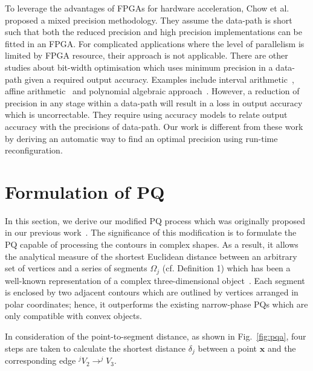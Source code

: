 To leverage the advantages of FPGAs for hardware acceleration, Chow et al.~\cite{chow11} proposed a mixed precision methodology.
They assume the data-path is short such that both the reduced precision and high precision implementations can be fitted in an FPGA.
For complicated applications where the level of parallelism is limited by FPGA resource, their approach is not applicable.
There are other studies about bit-width optimisation which uses minimum precision in a data-path given a required output accuracy.
Examples include interval arithmetic~\cite{fang03}, affine arithmetic~\cite{lee05,osborne07} and polynomial algebraic approach~\cite{boland10}.
However, a reduction of precision in any stage within a data-path will result in a loss in output accuracy which is uncorrectable.
They require using accuracy models to relate output accuracy with the precisions of data-path.
Our work is different from these work by deriving an automatic way to find an optimal precision using run-time reconfiguration.

\section{Formulation of PQ}
\label{sec:formulation}

In this section, we derive our modified PQ process which was originally proposed in our previous work~\cite{kwok13}. 
The significance of this modification is to formulate the PQ capable of processing the contours in complex shapes. 
As a result, it allows the analytical measure of the shortest Euclidean distance between an arbitrary set of vertices and a series of segments $\Omega_j$ (cf. Definition 1) which has been a well-known representation of a complex three-dimensional object~\cite{ponce89}. 
Each segment is enclosed by two adjacent contours which are outlined by vertices arranged in polar coordinates; 
hence, it outperforms the existing narrow-phase PQs which are only compatible with convex objects. 

In consideration of the point-to-segment distance, as shown in Fig.~\ref{fig:pqa}, four steps are taken to calculate the shortest distance $\delta_j$ between a point $\boldsymbol{x}$ and the corresponding edge $^jV_2 \rightarrow ^jV_3$.

